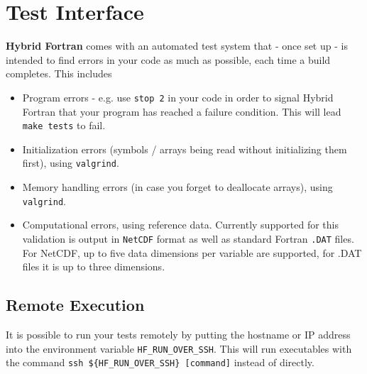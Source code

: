 \section{Test Interface} \label{sec:testSystem}
\textbf{Hybrid Fortran} comes with an automated test system that - once set up - is intended to find errors in your code as much as possible, each time a build completes. This includes
\begin{itemize}
 \item Program errors - e.g. use \verb|stop 2| in your code in order to signal Hybrid Fortran that your program has reached a failure condition. This will lead \verb|make tests| to fail.
 \item Initialization errors (symbols / arrays being read without initializing them first), using \verb|valgrind|.
 \item Memory handling errors (in case you forget to deallocate arrays), using \verb|valgrind|.
 \item Computational errors, using reference data. Currently supported for this validation is output in \verb|NetCDF| format as well as standard Fortran \verb|.DAT| files. For NetCDF, up to five data dimensions per variable are supported, for .DAT files it is up to three dimensions.
\end{itemize}

\subsection{Remote Execution}
It is possible to run your tests remotely by putting the hostname or IP address into the environment variable \verb|HF_RUN_OVER_SSH|. This will run executables with the command \verb|ssh ${HF_RUN_OVER_SSH} [command]| instead of directly.

